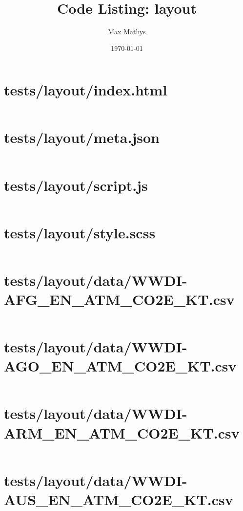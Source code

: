 \documentclass[a4paper]{article}
\title{Code Listing: layout}
\author{Max Mathys}
\date{\today}
\begin{document}
\maketitle

\section{tests/layout/index.html}
\inputminted[linenos,breaklines,breakbytoken]{html}{tests/layout/index.html}

\section{tests/layout/meta.json}
\inputminted[linenos,breaklines,breakbytoken]{json}{tests/layout/meta.json}

\section{tests/layout/script.js}
\inputminted[linenos,breaklines,breakbytoken]{javascript}{tests/layout/script.js}

\section{tests/layout/style.scss}
\inputminted[linenos,breaklines,breakbytoken]{scss}{tests/layout/style.scss}

\section{tests/layout/data/WWDI-AFG\_EN\_ATM\_CO2E\_KT.csv}
\inputminted[linenos,breaklines,breakbytoken]{text}{tests/layout/data/WWDI-AFG_EN_ATM_CO2E_KT.csv}

\section{tests/layout/data/WWDI-AGO\_EN\_ATM\_CO2E\_KT.csv}
\inputminted[linenos,breaklines,breakbytoken]{text}{tests/layout/data/WWDI-AGO_EN_ATM_CO2E_KT.csv}

\section{tests/layout/data/WWDI-ARM\_EN\_ATM\_CO2E\_KT.csv}
\inputminted[linenos,breaklines,breakbytoken]{text}{tests/layout/data/WWDI-ARM_EN_ATM_CO2E_KT.csv}

\section{tests/layout/data/WWDI-AUS\_EN\_ATM\_CO2E\_KT.csv}
\inputminted[linenos,breaklines,breakbytoken]{text}{tests/layout/data/WWDI-AUS_EN_ATM_CO2E_KT.csv}
\end{document}
